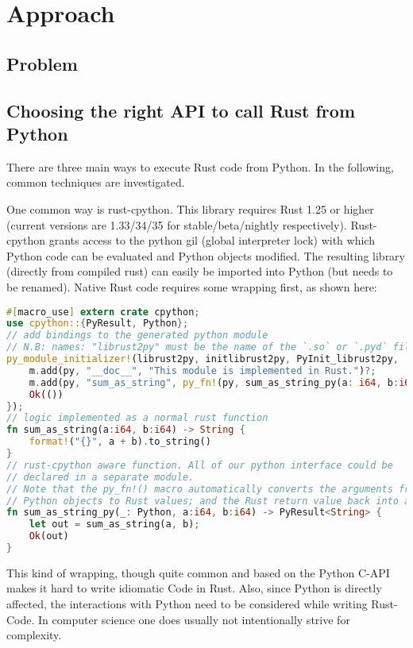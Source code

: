 \chapter{Approach}\label{chap:approach}


\section{Problem}\label{sec:problem}






\section{Choosing the right API to call Rust from Python}\label{sec:api}

There are three main ways to execute Rust code from Python. In the following, common techniques are investigated.

One common way is rust-cpython. This library requires Rust 1.25 or higher (current versions are 1.33/34/35 for stable/beta/nightly respectively). Rust-cpython grants access to the python gil (global interpreter lock) with which Python code can be evaluated and Python objects modified. The resulting library (directly from compiled rust) can easily be imported into Python (but needs to be renamed). Native Rust code requires some wrapping first, as shown here:
\begin{lstlisting}[language=Rust]
#[macro_use] extern crate cpython;
use cpython::{PyResult, Python};
// add bindings to the generated python module
// N.B: names: "librust2py" must be the name of the `.so` or `.pyd` file
py_module_initializer!(librust2py, initlibrust2py, PyInit_librust2py, |py, m| {
    m.add(py, "__doc__", "This module is implemented in Rust.")?;
    m.add(py, "sum_as_string", py_fn!(py, sum_as_string_py(a: i64, b:i64)))?;
    Ok(())
});
// logic implemented as a normal rust function
fn sum_as_string(a:i64, b:i64) -> String {
    format!("{}", a + b).to_string()
}
// rust-cpython aware function. All of our python interface could be
// declared in a separate module.
// Note that the py_fn!() macro automatically converts the arguments from
// Python objects to Rust values; and the Rust return value back into a Python object.
fn sum_as_string_py(_: Python, a:i64, b:i64) -> PyResult<String> {
    let out = sum_as_string(a, b);
    Ok(out)
}
\end{lstlisting}
This kind of wrapping, though quite common and based on the Python C-API makes it hard to write idiomatic Code in Rust. Also, since Python is directly affected, the interactions with Python need to be considered while writing Rust-Code. In computer science one does usually not intentionally strive for complexity.

